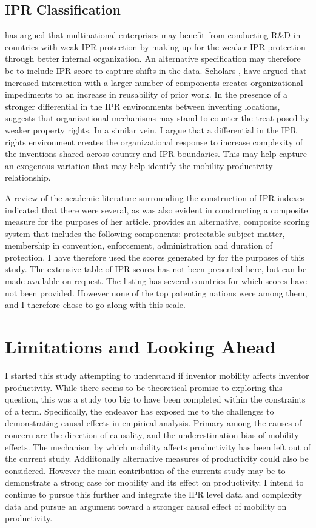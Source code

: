 \documentclass[12pt]{article}
\begin{document}
\subsection{IPR Classification}
\cite{Zhao2006} has argued  that multinational enterprises may benefit from conducting R\&D in countries with weak IPR protection by  making up for the weaker IPR protection through better internal organization. An alternative specification may therefore be to include IPR score to capture shifts in the data. Scholars \citep{Yayavaram2008, Baldwin2015}, have argued that increased interaction with a larger number of components creates organizational impediments to an increase in reusability of prior work. In the presence of a stronger differential in the IPR environments between inventing locations, \cite{Zhao2006} suggests that organizational mechanisms may stand to counter the treat posed by weaker property rights. In a similar vein, I argue that a differential in the IPR rights environment creates the organizational response to increase complexity of the inventions shared across country and IPR boundaries. This may help capture an exogenous variation that may help identify the mobility-productivity relationship.

A review of the academic literature surrounding the construction of IPR indexes indicated that there were several, as was also evident in \cite{Zhao2006} constructing a composite measure for the purposes of her article. \cite{Lesser2010} provides an alternative, composite scoring system that includes the following components: protectable subject matter, membership in convention, enforcement, administration and duration of protection. I have therefore used the scores generated by \cite{Lesser2010} for the purposes of this study. The extensive table of IPR scores has not been presented here, but can be made available on request. The listing has several countries for which scores have not been provided. However none of the top patenting nations were among them, and I therefore chose to go along with this scale.

\section{Limitations and Looking Ahead}
I started this study attempting to understand if inventor mobility affects inventor productivity. While there seems to be theoretical promise to exploring this question, this was a study too big to have been completed within the constraints of a term. Specifically, the endeavor has exposed me to the challenges to demonstrating causal effects in empirical analysis. Primary among the causes of concern are the direction of causality, and the underestimation bias of mobility - effects. The mechanism by which mobility affects productivity has been left out of the current study. Addiitonally alternative measures of productivity could also be considered. However the main contribution of the currents study may be to demonstrate a strong case for mobility and its effect on productivity.  I intend to continue to pursue this further and integrate the IPR level data and complexity data and pursue an argument toward a stronger causal effect of mobility on productivity.
\end{document}
